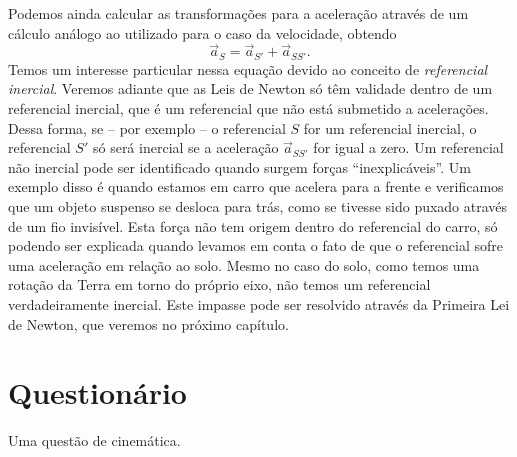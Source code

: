 Podemos ainda calcular as transformações para a aceleração através de um cálculo análogo ao utilizado para o caso da velocidade, obtendo
\begin{equation}
  \vec{a}_S = \vec{a}_{S'} + \vec{a}_{SS'}.
\end{equation}
%
Temos um interesse particular nessa equação devido ao conceito de \emph{referencial inercial}. Veremos adiante que as Leis de Newton só têm validade dentro de um referencial inercial, que é um referencial que não está submetido a acelerações. Dessa forma, se -- por exemplo -- o referencial $S$ for um referencial inercial, o referencial $S'$ só será inercial se a aceleração $\vec{a}_{SS'}$ for igual a zero. Um referencial não inercial pode ser identificado quando surgem forças ``inexplicáveis''. Um exemplo disso é quando estamos em carro que acelera para a frente e verificamos que um objeto suspenso se desloca para trás, como se tivesse sido puxado através de um fio invisível. Esta força não tem origem dentro do referencial do carro, só podendo ser explicada quando levamos em conta o fato de que o referencial sofre uma aceleração em relação ao solo. Mesmo no caso do solo, como temos uma rotação da Terra em torno do próprio eixo, não temos um referencial verdadeiramente inercial. Este impasse pode ser resolvido através da Primeira Lei de Newton, que veremos no próximo capítulo.

\section{Questionário}

\begin{question}[type={exam}]
Uma questão de cinemática.
\end{question}
